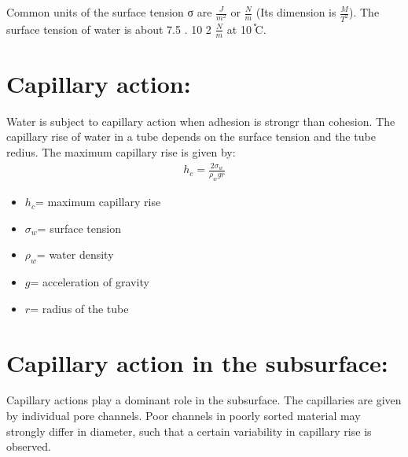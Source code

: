 \documentclass[letterpaper,10pt,english]{jupyterBook}
\let\sphinxpxdimen\pdfpxdimen\else\newdimen\sphinxpxdimen
\begin{document}
\sphinxAtStartPar
Common units of the surface tension σ are \(\frac{J}{m^2}\) or \(\frac{N}{m}\) (Its dimension is \(\frac{M}{T^2}\)). The surface tension of water is about 7.5 . 10 \sphinxhyphen{}2 \(\frac{N}{m}\) at 10 ֯C.


\section{Capillary action:}
\label{\detokenize{content/flow/12_subsurface_structure:capillary-action}}
\noindent{\hspace*{\fill}\sphinxincludegraphics[width=200\sphinxpxdimen]{{L02_fig13}.png}\hspace*{\fill}}

\sphinxAtStartPar
Water is subject to capillary action when adhesion is strongr than cohesion. The capillary rise of water in a tube depends on the surface tension and the tube redius. The maximum capillary rise is given by:
\begin{equation*}
\begin{split}{h_{c}}=\frac{2\sigma_{w}}{\rho_{w}{g}{r}}\end{split}
\end{equation*}\begin{itemize}
\item {} 
\sphinxAtStartPar
\({h_{c}}\)= maximum capillary rise

\item {} 
\sphinxAtStartPar
\(\sigma_{w}\)= surface tension

\item {} 
\sphinxAtStartPar
\(\rho_{w}\)= water density

\item {} 
\sphinxAtStartPar
\({g}\)= acceleration of gravity

\item {} 
\sphinxAtStartPar
\({r}\)= radius of the tube

\end{itemize}


\section{Capillary action in the subsurface:}
\label{\detokenize{content/flow/12_subsurface_structure:capillary-action-in-the-subsurface}}
\sphinxAtStartPar
Capillary actions play a dominant role in the subsurface. The capillaries are given by individual pore channels. Poor channels in poorly sorted material may strongly differ in diameter, such that a certain variability in capillary rise is observed.
\end{document}
